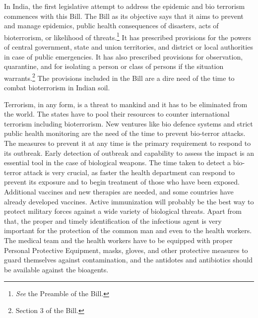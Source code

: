 \begin{multicols}{2}

\noi
In India, the first legislative attempt to address the epidemic and bio terrorism commences
with this Bill. The Bill as its objective says that it aims to prevent and manage epidemics,
public health consequences of disasters, acts of bioterrorism, or likelihood of threats.\footnote{\textit{See} the Preamble of the Bill.} It has prescribed provisions for the powers of central government, state and union territories, and
district or local authorities in case of public emergencies. It has also prescribed provisions for observation, quarantine, and for isolating a person or class of persons if the situation
warrants.\footnote{Section 3 of the Bill.}  The provisions included in the Bill are a dire need of the time to combat bioterrorism in Indian soil.


\noi
Terrorism, in any form, is a threat to mankind and it has to be eliminated from the world. The
states have to pool their resources to counter international terrorism including bioterrorism.
New ventures like bio defence systems and strict public health monitoring are the need of the
time to prevent bio-terror attacks. The measures to prevent it at any time is the primary
requirement to respond to its outbreak. Early detection of outbreak and capability to assess
the impact is an essential tool in the case of biological weapons. The time taken to detect a
bio-terror attack is very crucial, as faster the health department can respond to prevent its
exposure and to begin treatment of those who have been exposed. Additional vaccines and
new therapies are needed, and some countries have already developed vaccines. Active
immunization will probably be the best way to protect military forces against a wide variety
of biological threats. Apart from that, the proper and timely identification of the infectious
agent is very important for the protection of the common man and even to the health workers.
The medical team and the health workers have to be equipped with proper Personal
Protective Equipment, masks, gloves, and other protective measures to guard themselves
against contamination, and the antidotes and antibiotics should be available against the bioagents.


\end{multicols}
